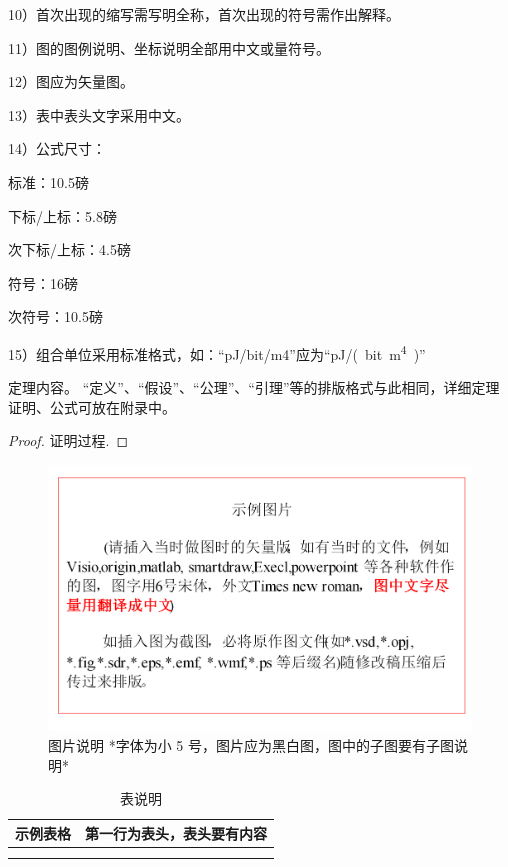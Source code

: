 \documentclass{cjc}
\begin{document}
10）首次出现的缩写需写明全称，首次出现的符号需作出解释。

11）图的图例说明、坐标说明全部用中文或量符号。

12）图应为矢量图。

13）表中表头文字采用中文。

14）公式尺寸：

标准：10.5磅

下标/上标：5.8磅

次下标/上标：4.5磅

符号：16磅 \cite{article_example}

次符号：10.5磅

15）组合单位采用标准格式，如：“pJ/bit/m4”应为“\si{pJ/(bit.m^4)}”


\begin{theorem}
  定理内容。
  “定义”、“假设”、“公理”、“引理”等的排版格式与此相同，详细定理证明、公式可放在附录中。
\end{theorem}

\begin{proof}
  证明过程.
\end{proof}

\begin{figure}[htb]
  \centering
  \includegraphics[width=\linewidth]{example-fig.pdf}
  \caption{图片说明 *字体为小 5 号，图片应为黑白图，图中的子图要有子图说明*}
\end{figure}

\begin{table}[htb]
  \centering
  \caption{表说明}
  \small
  \begin{tabular}{cc}
    \toprule
    示例表格 & 第一行为表头，表头要有内容 \\
    \midrule
    & \\
    \midrule
    & \\
    \bottomrule
  \end{tabular}
\end{table}
\end{document}
